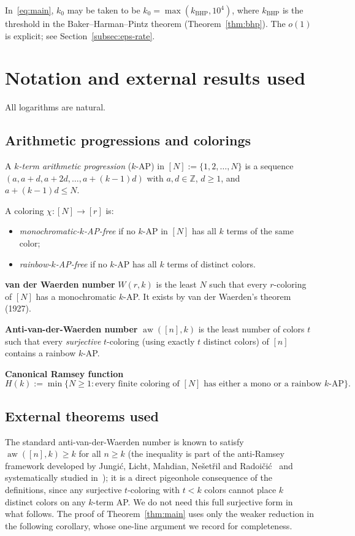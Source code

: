 \documentclass[11pt,reqno,a4paper]{amsart}
\theoremstyle{plain}
\theoremstyle{definition}
\theoremstyle{remark}
\numberwithin{equation}{section}
\DeclareMathOperator{\aw}{aw}
\begin{document}
In~\eqref{eq:main}, $k_{0}$ may be taken to be
$k_{0}=\max(k_{\mathrm{BHP}},10^{4})$, where $k_{\mathrm{BHP}}$ is the
threshold in the Baker--Harman--Pintz theorem
(Theorem~\ref{thm:bhp}). The $o(1)$ is explicit; see
Section~\ref{subsec:eps-rate}.

\section{Notation and external results used}
\label{sec:notation}

All logarithms are natural.

\subsection{Arithmetic progressions and colorings}
\label{subsec:ap}

A \emph{$k$-term arithmetic progression} ($k$-AP) in
$[N]:=\{1,2,\ldots,N\}$ is a sequence $(a,a+d,a+2d,\ldots,a+(k-1)d)$
with $a,d\in\mathbb{Z}$, $d\ge 1$, and $a+(k-1)d\le N$.

A coloring $\chi:[N]\to[r]$ is:
\begin{itemize}
\item \emph{monochromatic-$k$-AP-free} if no $k$-AP in $[N]$ has all
  $k$ terms of the same color;
\item \emph{rainbow-$k$-AP-free} if no $k$-AP has all $k$ terms of
  distinct colors.
\end{itemize}

\noindent\textbf{van der Waerden number} $W(r,k)$ is the least $N$ such
that every $r$-coloring of $[N]$ has a monochromatic $k$-AP. It exists
by van der Waerden's theorem (1927).

\noindent\textbf{Anti-van-der-Waerden number} $\aw([n],k)$ is the
least number of colors $t$ such that every \emph{surjective}
$t$-coloring (using exactly $t$ distinct colors) of $[n]$ contains a
rainbow $k$-AP.

\noindent\textbf{Canonical Ramsey function}
\[
H(k):=\min\bigl\{N\ge 1:\text{every finite coloring of }[N]
\text{ has either a mono or a rainbow }k\text{-AP}\bigr\}.
\]

\subsection{External theorems used}
\label{subsec:ext}

The standard anti-van-der-Waerden number is known to satisfy
$\aw([n],k)\ge k$ for all $n\ge k$ (the inequality is part of the
anti-Ramsey framework developed by Jungi\'c, Licht, Mahdian,
Ne\v{s}et\v{r}il and Radoi\v{c}i\'c~\cite{JLMR} and systematically
studied in~\cite{BEHH2016}); it is a direct pigeonhole consequence
of the definitions, since any surjective $t$-coloring with $t<k$
colors cannot place $k$ distinct colors on any $k$-term AP. We do
not need this full surjective form in what follows. The proof of
Theorem~\ref{thm:main} uses only the weaker reduction in the
following corollary, whose one-line argument we record for
completeness.
\end{document}
